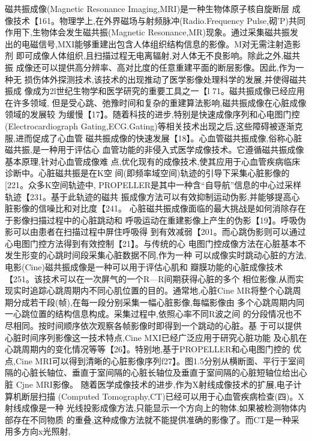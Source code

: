 磁共振成像(Magnetic
 Resonance
  Imaging,MRI)是一种生物体原子核自旋断层
  成像技术【161。物理学上,在外界磁场与射频脉冲(Radio.Frequency Pulse,砌’P)共同
  作用下,生物体会发生磁共振(Magnetic Resonance,MR)现象。通过采集磁共振发
  出的电磁信号,MXI能够重建出包含人体组织结构信息的影像。M对无需注射造影剂
  即可成像人体组织,且扫描过程无电离辐射,对人体无不良影响。除此之外,磁共振
  成像还可以提供高分辨率、高对比度的任意重建平面的断层影像。因此,作为一种无
  损伤体外探测技术,该技术的出现推动了医学影像处理科学的发展,并使得磁共振成
  像成为2l世纪生物学和医学研究的重要工具之一【l 71。磁共振成像已经应用在许多领域,
  但是受心跳、弛豫时间和复杂的重建算法影响,磁共振成像在心脏成像领域的发展较
  为缓慢【17】。随着科技的进步,特别是快速成像序列和心电图门控(Electrocardiograph
  Gating,ECG.Gating)等相关技术出现之后,这些障碍被逐渐克服,进而促成了心血管
  磁共振成像的快速发展【18】。心血管磁共振成像,俗称心脏磁共振,是一种用于评估心
  血管功能的非侵入式医学成像技术。它遵循磁共振成像基本原理,针对心血管成像难
  点,优化现有的成像技术,使其应用于心血管疾病临床诊断中。心脏磁共振是在K空
  间(即频率域空间)轨迹的引导下采集心脏影像的[221。众多K空间轨迹中,
  PROPELLER是其中一种含“自导航”信息的中心过采样轨迹【231。基于此轨迹的磁共
  振成像方法可以有效抑制运动伪影,并能够提高心脏影像的信噪比和对比度【241。
  心脏磁共振成像面临的最大挑战是如何消除存在于影像扫描过程中的心脏跳动和
  呼吸运动在重建影像上产生的伪影【19】。呼吸伪影可以由患者在扫描过程中屏住呼吸得
  到有效减弱【201。而心跳伪影则可以通过心电图门控方法得到有效控制【21】。与传统的心
  电图门控成像方法在心脏基本不发生形变的心跳时间段采集心脏数据不同,作为一种
  可以成像实时跳动心脏的方法,电影(Cine)磁共振成像是一种可以用于评估心肌和
  瓣膜功能的心脏成像技术【251。该技术可以在一次屏气的一个R—R间期获得心脏的多个
  相位影像,从而实现实时追踪心跳周期内不同心肌位置的目的。通常地,心脏Cine
  MR将整个心跳周期分成若干段(帧),在每一段分别采集一幅心脏影像,每幅影像由
  多个心跳周期内同一心跳位置的结构信息构成。采集过程中,依照心率不同R波之间
  的分段情况也不尽相同。按时间顺序依次观察各帧影像时即得到一个跳动的心脏。基
  于可以提供心脏时间序列影像这一技术特点,Cine MXI已经广泛应用于研究心脏功能
  及心肌在心跳周期内的变化情况等等【26】。特别地,基于PROPELLER和心电图门控的
  优点,Cine MRI可以得到清晰的心脏影像序列f27】。图1.5分别从横断面、平行于室间
  隔的心脏长轴位、垂直于室间隔的心脏长轴位及垂直于室间隔的心脏短轴位给出心脏
  Cjne MRI影像。
  随着医学成像技术的进步,作为X射线成像技术的扩展,电子计算机断层扫描
  (Computed
   Tomography,CT)已经可以用于心血管疾病检查(四)。X射线成像是一种
   光线投影成像方法,只能显示一个方向上的物体,如果被检测物体内部存在不同物质
   的重叠,这种成像方法就不能提供准确的影像了。而CT是一种采用多方向x光照射,
